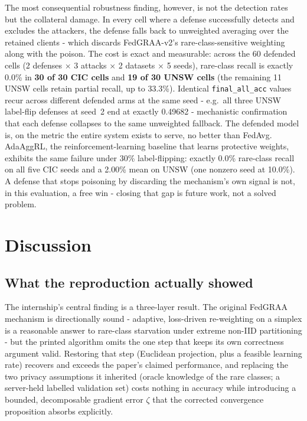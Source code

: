 \documentclass[11pt,a4paper]{report}
\begin{document}
The most consequential robustness finding, however, is not the detection
rates but the collateral damage. In every cell where a defense successfully
detects and excludes the attackers, the defense falls back to unweighted
averaging over the retained clients - which discards FedGRAA-v2's
rare-class-sensitive weighting along with the poison. The cost is exact and
measurable: across the 60 defended cells (2 defenses $\times$ 3 attacks
$\times$ 2 datasets $\times$ 5 seeds), rare-class recall is exactly 0.0\% in
\textbf{30 of 30 CIC cells} and \textbf{19 of 30 UNSW cells} (the remaining
11 UNSW cells retain partial recall, up to 33.3\%). Identical
\texttt{final\_all\_acc} values recur across different defended arms at the
same seed - e.g.\ all three UNSW label-flip defenses at seed~2 end at
exactly 0.49682 - mechanistic confirmation that each defense collapses to
the same unweighted fallback. The defended model is, on the metric the
entire system exists to serve, no better than FedAvg. AdaAggRL, the
reinforcement-learning baseline that learns protective weights, exhibits
the same failure under 30\% label-flipping: exactly 0.0\% rare-class recall
on all five CIC seeds and a 2.00\% mean on UNSW (one nonzero seed at
10.0\%). A defense that stops poisoning by discarding the mechanism's own
signal is not, in this evaluation, a free win - closing that gap is future
work, not a solved problem.

\chapter{Discussion}
\label{ch:discussion}

\section{What the reproduction actually showed}
\label{sec:what-showed}

The internship's central finding is a three-layer result. The original
FedGRAA mechanism is directionally sound - adaptive, loss-driven
re-weighting on a simplex is a reasonable answer to rare-class starvation
under extreme non-IID partitioning - but the printed algorithm omits the
one step that keeps its own correctness argument valid. Restoring that step
(Euclidean projection, plus a feasible learning rate) recovers and exceeds
the paper's claimed performance, and replacing the two privacy assumptions
it inherited (oracle knowledge of the rare classes; a server-held labelled
validation set) costs nothing in accuracy while introducing a bounded,
decomposable gradient error $\zeta$ that the corrected convergence
proposition absorbs explicitly.
\end{document}
